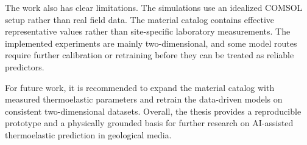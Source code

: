 The work also has clear limitations. The simulations use an idealized COMSOL setup rather than real field data. The material catalog contains effective representative values rather than site-specific laboratory measurements. The implemented experiments are mainly two-dimensional, and some model routes require further calibration or retraining before they can be treated as reliable predictors.

For future work, it is recommended to expand the material catalog with measured thermoelastic parameters and retrain the data-driven models on consistent two-dimensional datasets. Overall, the thesis provides a reproducible prototype and a physically grounded basis for further research on AI-assisted thermoelastic prediction in geological media.

